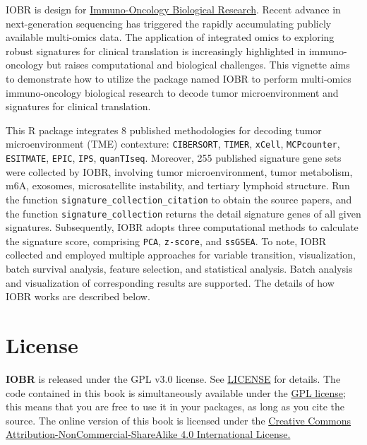 \documentclass[
  12pt,
]{book}
\theoremstyle{definition}
\theoremstyle{definition}
\theoremstyle{definition}
\theoremstyle{definition}
\theoremstyle{remark}
\begin{document}
IOBR is design for \href{https://github.com/IOBR/IOBR}{Immuno-Oncology Biological Research}.
Recent advance in next-generation sequencing has triggered the rapidly accumulating publicly available multi-omics data. The application of integrated omics to exploring robust signatures for clinical translation is increasingly highlighted in immuno-oncology but raises computational and biological challenges. This vignette aims to demonstrate how to utilize the package named IOBR to perform multi-omics immuno-oncology biological research to decode tumor microenvironment and signatures for clinical translation.

This R package integrates 8 published methodologies for decoding tumor microenvironment (TME) contexture: \texttt{CIBERSORT}, \texttt{TIMER}, \texttt{xCell}, \texttt{MCPcounter}, \texttt{ESITMATE}, \texttt{EPIC}, \texttt{IPS}, \texttt{quanTIseq}. Moreover, 255 published signature gene sets were collected by IOBR, involving tumor microenvironment, tumor metabolism, m6A, exosomes, microsatellite instability, and tertiary lymphoid structure. Run the function \texttt{signature\_collection\_citation} to obtain the source papers, and the function \texttt{signature\_collection} returns the detail signature genes of all given signatures. Subsequently, IOBR adopts three computational methods to calculate the signature score, comprising \texttt{PCA}, \texttt{z-score}, and \texttt{ssGSEA}. To note, IOBR collected and employed multiple approaches for variable transition, visualization, batch survival analysis, feature selection, and statistical analysis. Batch analysis and visualization of corresponding results are supported. The details of how IOBR works are described below.

\hypertarget{license}{%
\section{License}\label{license}}

\textbf{IOBR} is released under the GPL v3.0 license. See \href{https://github.com/IOBR/IOBR/blob/master/LICENSE}{LICENSE} for details. The code contained in this book is simultaneously available under the \href{https://www.gnu.org/licenses/why-not-lgpl.html}{GPL license}; this means that you are free to use it in your packages, as long as you cite the source. The online version of this book is licensed under the \href{https://creativecommons.org/licenses/by-nc-sa/4.0/}{Creative Commons Attribution-NonCommercial-ShareAlike 4.0 International License.}
\end{document}
